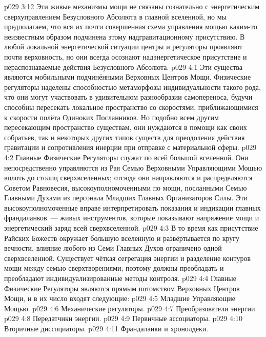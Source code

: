 \vs p029 3:12 Эти живые механизмы мощи не связаны сознательно с энергетическим сверхуправлением Безусловного Абсолюта в главной вселенной, но мы предполагаем, что вся их почти совершенная схема управления мощью каким\hyp{}то неизвестным образом подчинена этому надгравитационному присутствию. В любой локальной энергетической ситуации центры и регуляторы проявляют почти верховность, но они всегда осознают надэнергетическое присутствие и нераспознаваемые действия Безусловного Абсолюта.
\vs p029 4:1 Эти существа являются мобильными подчинёнными Верховных Центров Мощи. Физические регуляторы наделены способностью метаморфозы индивидуальности такого рода, что они могут участвовать в удивительном разнообразии самопереноса, будучи способны пересекать локальное пространство со скоростями, приближающимися к скорости полёта Одиноких Посланников. Но подобно всем другим пересекающим пространство существам, они нуждаются в помощи как своих собратьев, так и некоторых других типов существ для преодоления действия гравитации и сопротивления инерции при отправке с материальной сферы.
\vs p029 4:2 Главные Физические Регуляторы служат по всей большой вселенной. Они непосредственно управляются из Рая Семью Верховными Управляющими Мощью вплоть до столиц сверхвселенных; отсюда они направляются и распределяются Советом Равновесия, высокоуполномоченными по мощи, посланными Семью Главными Духами из персонала Младших Главных Организаторов Силы. Эти высокоуполномоченные вправе интерпретировать показания и индикации главных франдаланков~--- живых инструментов, которые показывают напряжение мощи и энергетический заряд всей сверхвселенной.
\vs p029 4:3 В то время как присутствие Райских Божеств окружает большую вселенную и развёртывается по кругу вечности, влияние любого из Семи Главных Духов ограничено одной сверхвселенной. Существует чёткая сегрегация энергии и разделение контуров мощи между семью сверхтворениями; поэтому должны преобладать и преобладают индивидуализированные методы контроля.
\vs p029 4:4 \pc Главные Физические Регуляторы являются прямым потомством Верховных Центров Мощи, и в их число входят следующие:
\vs p029 4:5 Младшие Управляющие Мощью.
\vs p029 4:6 Механические регуляторы.
\vs p029 4:7 Преобразователи энергии.
\vs p029 4:8 Передатчики энергии.
\vs p029 4:9 Первичные ассоциаторы.
\vs p029 4:10 Вторичные диссоциаторы.
\vs p029 4:11 Франдаланки и хронолдеки.
